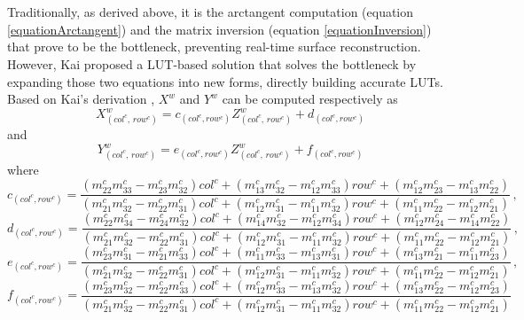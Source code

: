 \\\\%
%
\noindent
Traditionally, as derived above, it is the arctangent computation (equation \ref{equationArctangent}) and the matrix inversion (equation \ref{equationInversion}) that prove to be the bottleneck, preventing real-time surface reconstruction. However, Kai proposed a LUT-based solution that solves the bottleneck by expanding those two equations into new forms, directly building accurate LUTs. Based on Kai's derivation \cite{Kai10}, \(X^{w}\) and \(Y^{w}\) can be computed respectively as 
%
\begin{equation}
X^w_{(col^c, \, row^c)} = c_{(col^c, row^c)}Z^w_{(col^c, \, row^c)}+d_{(col^c, row^c)}
\label{equationLUT_X}
\end{equation}%
and %
\begin{equation}
Y^w_{(col^c, \, row^c)} = e_{(col^c, row^c)}Z^w_{(col^c, \, row^c)}+f_{(col^c, row^c)}
\label{equationLUT_Y}
\end{equation}
%
where 
%
\begin{equation*}%
c_{(col^c, row^c)} %
= \frac%
{(m^c_{22}m^c_{33} - m^c_{23}m^c_{32})col^c + (m^c_{13}m^c_{32} - m^c_{12}m^c_{33})row^c + (m^c_{12}m^c_{23} - m^c_{13}m^c_{22})}%
{(m^c_{21}m^c_{32} - m^c_{22}m^c_{31})col^c + (m^c_{12}m^c_{31} - m^c_{11}m^c_{32})row^c + (m^c_{11}m^c_{22} - m^c_{12}m^c_{21})} \, ,
\end{equation*}
%
\begin{equation*}%
d_{(col^c, row^c)} %
= \frac%
{(m^c_{22}m^c_{34} - m^c_{24}m^c_{32})col^c + (m^c_{14}m^c_{32} - m^c_{12}m^c_{34})row^c + (m^c_{12}m^c_{24} - m^c_{14}m^c_{22})}%
{(m^c_{21}m^c_{32} - m^c_{22}m^c_{31})col^c + (m^c_{12}m^c_{31} - m^c_{11}m^c_{32})row^c + (m^c_{11}m^c_{22} - m^c_{12}m^c_{21})} \, ,
\end{equation*}
%
\begin{equation*}%
e_{(col^c, row^c)} %
= \frac%
{(m^c_{23}m^c_{31} - m^c_{21}m^c_{33})col^c + (m^c_{11}m^c_{33} - m^c_{13}m^c_{31})row^c + (m^c_{13}m^c_{21} - m^c_{11}m^c_{23})}%
{(m^c_{21}m^c_{32} - m^c_{22}m^c_{31})col^c + (m^c_{12}m^c_{31} - m^c_{11}m^c_{32})row^c + (m^c_{11}m^c_{22} - m^c_{12}m^c_{21})} \, ,
\end{equation*}
%
\begin{equation*}%
f_{(col^c, row^c)} %
= \frac%
{(m^c_{23}m^c_{32} - m^c_{22}m^c_{33})col^c + (m^c_{12}m^c_{33} - m^c_{13}m^c_{32})row^c + (m^c_{13}m^c_{22} - m^c_{12}m^c_{23})}%
{(m^c_{21}m^c_{32} - m^c_{22}m^c_{31})col^c + (m^c_{12}m^c_{31} - m^c_{11}m^c_{32})row^c + (m^c_{11}m^c_{22} - m^c_{12}m^c_{21})}
\end{equation*}
